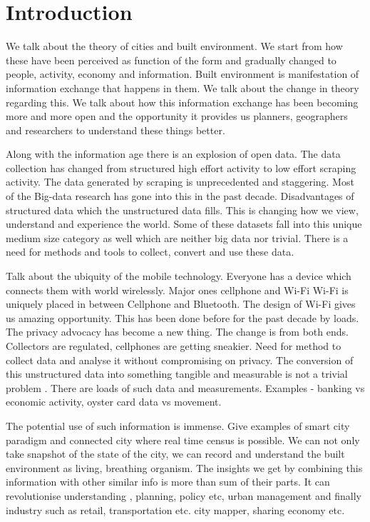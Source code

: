 \chapter{Introduction}


We talk about the theory of cities and built environment. We start from how
these have been perceived as function of the form and gradually changed to
people, activity, economy and information. Built environment is manifestation of
information exchange that happens in them. We talk about the change in theory
regarding this. We talk about how this information exchange has been becoming
more and more open and the opportunity it provides us planners, geographers and
researchers to understand these things better.

Along with the information age there is an explosion of open data. The data
collection has changed from structured high effort activity to low effort
scraping activity. The data generated by scraping is unprecedented and
staggering. Most of the Big-data research has gone into this in the past decade.
Disadvantages of structured data which the unstructured data fills. This is
changing how we view, understand and experience the world. Some of these
datasets fall into this unique medium size category as well which are neither
big data nor trivial. There is a need for methods and tools to collect, convert
and use these data.

Talk about the ubiquity of the mobile technology. Everyone has a device which
connects them with world wirelessly. Major ones cellphone and Wi-Fi Wi-Fi is
uniquely placed in between Cellphone and Bluetooth. The design of Wi-Fi gives us
amazing opportunity. This has been done before for the past decade by loads. The
privacy advocacy has become a new thing. The change is from both ends.
Collectors are regulated, cellphones are getting sneakier. Need for method to
collect data and analyse it without compromising on privacy. The conversion of
this unstructured data into something tangible and measurable is not a trivial
problem \cite{gandomi2015beyond}. There are loads of such data and measurements. Examples - banking vs
economic activity, oyster card data vs movement.

The potential use of such information is immense. Give examples of smart city
paradigm and connected city where real time census is possible. We can not only
take snapshot of the state of the city, we can record and understand the built
environment as living, breathing organism. The insights we get by combining this
information with other similar info is more than sum of their parts. It can
revolutionise understanding , planning, policy etc, urban management and finally
industry such as retail, transportation etc. city mapper, sharing economy etc.
